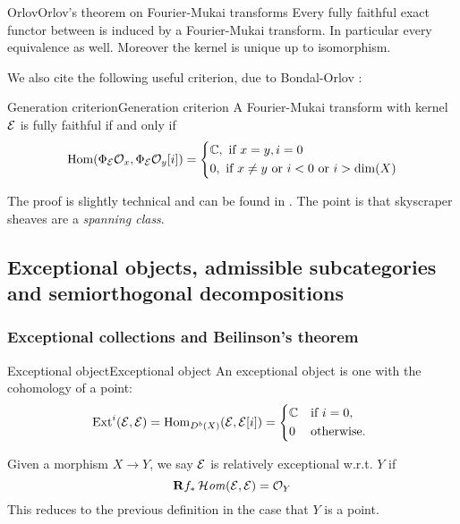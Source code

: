 \begin{theorem}{Orlov}{Orlov's theorem on Fourier-Mukai transforms}
    Every fully faithful exact functor between is induced by a Fourier-Mukai transform. In particular every equivalence as well. Moreover the kernel is unique up to isomorphism.
\end{theorem}

We also cite the following useful criterion, due to Bondal-Orlov \cite{bondal_semiorthogonal_1995}:
\begin{proposition}{Generation criterion}{Generation criterion}
    A Fourier-Mukai transform with kernel $\mathcal{E}$ is fully faithful if and only if \begin{gather*}
        \Hom (\Phi_\calE \O_x, \Phi_\calE \O_y[i])=\begin{cases*}
           \C, \text{ if }x=y, i=0\\
           0, \text{ if }x\neq y \text{ or } i<0 \text{ or } i> \dim(X)
        \end{cases*}
    \end{gather*}

\end{proposition}

The proof is slightly technical and can be found in \cite[\S7][Proposition~7.1]{Huybrechts}. The point is that skyscraper sheaves are a \emph{spanning class}.



\subsection{Exceptional objects, admissible subcategories and semiorthogonal decompositions}

\subsubsection{Exceptional collections and Beilinson's theorem}

\begin{definition}{Exceptional object}{Exceptional object}
    An exceptional object is one with the cohomology of a point:
    \begin{equation*}
        \Ext^i(\calE,\calE) = \Hom_{D^b(X)}(\calE,\calE[i]) = \begin{cases*}
            \C & if $i=0$, \\
            0 & otherwise.
        \end{cases*}
    \end{equation*}

    Given a morphism $X\rightarrow Y$, we say $\mathcal{E}$ is relatively exceptional w.r.t. $Y$ if $$\mathbf{R} f_* \operatorname{\mathcal{H}\mathit{om}}(\mathcal{E}, \mathcal{E})=\mathcal{O}_Y$$
    This reduces to the previous definition in the case that $Y$ is a point.
\end{definition}

